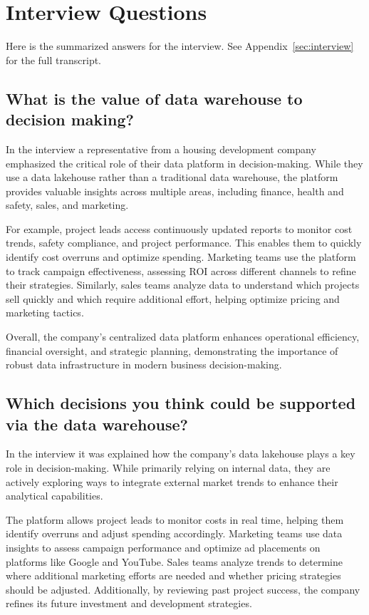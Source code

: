 \section{Interview Questions}
Here is the summarized answers for the interview. See Appendix~\ref{sec:interview} for the full transcript.
\subsection{What is the value of data warehouse to decision making?}

In the interview a representative from a housing development company emphasized the critical role of their data platform 
in decision-making. While they use a data lakehouse rather than a traditional data warehouse, the platform provides valuable 
insights across multiple areas, including finance, health and safety, sales, and marketing.

For example, project leads access continuously updated reports to monitor cost trends, safety compliance, and project performance. 
This enables them to quickly identify cost overruns and optimize spending. Marketing teams use the platform to track campaign 
effectiveness, assessing ROI across different channels to refine their strategies. Similarly, sales teams analyze data to understand 
which projects sell quickly and which require additional effort, helping optimize pricing and marketing tactics.

Overall, the company's centralized data platform enhances operational efficiency, financial oversight, and strategic planning, 
demonstrating the importance of robust data infrastructure in modern business decision-making.

\subsection{Which decisions you think could be supported via the data warehouse?}

In the interview it was explained how the company's data lakehouse plays a key role in decision-making. While primarily relying on 
internal data, they are actively exploring ways to integrate external market trends to enhance their analytical capabilities.

The platform allows project leads to monitor costs in real time, helping them identify overruns and adjust spending accordingly. 
Marketing teams use data insights to assess campaign performance and optimize ad placements on platforms like Google and YouTube. 
Sales teams analyze trends to determine where additional marketing efforts are needed and whether pricing strategies should be adjusted. 
Additionally, by reviewing past project success, the company refines its future investment and development strategies.

